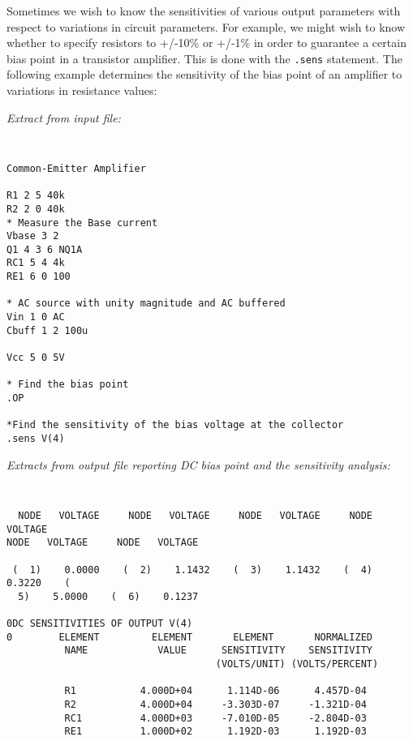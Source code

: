 Sometimes we wish to know the sensitivities of various output parameters
with respect to variations in circuit parameters.  For example, we might
wish to know whether to specify resistors to +/-10\% or +/-1\% in order
to guarantee a certain bias point in a transistor amplifier.  This is
done with the {\tt .sens} statement.  The following example determines
the sensitivity of the bias point of an amplifier to variations in resistance
values:\\
\centerline{}
\par\noindent
{\em Extract from input file:}
\par\noindent
\begin{center}
{\tt
\begin{verbatim}
Common-Emitter Amplifier

R1 2 5 40k
R2 2 0 40k
* Measure the Base current
Vbase 3 2
Q1 4 3 6 NQ1A
RC1 5 4 4k
RE1 6 0 100

* AC source with unity magnitude and AC buffered
Vin 1 0 AC
Cbuff 1 2 100u

Vcc 5 0 5V

* Find the bias point
.OP

*Find the sensitivity of the bias voltage at the collector
.sens V(4)
\end{verbatim}
}
\end{center}
\par\noindent
{\em Extracts from output file reporting DC bias point and the sensitivity
analysis:}
\par\noindent
\begin{center}
{\tt
\begin{verbatim}
  NODE   VOLTAGE     NODE   VOLTAGE     NODE   VOLTAGE     NODE   VOLTAGE
NODE   VOLTAGE     NODE   VOLTAGE

 (  1)    0.0000    (  2)    1.1432    (  3)    1.1432    (  4)    0.3220    (
  5)    5.0000    (  6)    0.1237

0DC SENSITIVITIES OF OUTPUT V(4)
0        ELEMENT         ELEMENT       ELEMENT       NORMALIZED
          NAME            VALUE      SENSITIVITY    SENSITIVITY
                                    (VOLTS/UNIT) (VOLTS/PERCENT)

          R1           4.000D+04      1.114D-06      4.457D-04
          R2           4.000D+04     -3.303D-07     -1.321D-04
          RC1          4.000D+03     -7.010D-05     -2.804D-03
          RE1          1.000D+02      1.192D-03      1.192D-03
\end{verbatim}
}
\end{center}

